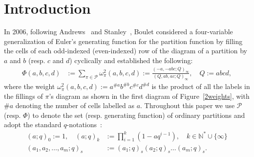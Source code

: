 \documentclass[12pt]{amsart}
\numberwithin{equation}{section}
\theoremstyle{plain}
\theoremstyle{definition}
\newcommand{\N}{\mathbb{N}}
\begin{document}
\section{Introduction}
 In 2006, following Andrews~\cite{and4} and  Stanley~\cite{st2}, Boulet \cite{bou} considered a four-variable generalization of Euler's  generating function  for the partition function by filling the cells of each odd-indexed (even-indexed) row of 
the diagram of a partition by $a$ and $b$ (resp. $c$ and $d$) cyclically 
and established the following:
\begin{align}\label{boulet}
\Phi(a,b,c,d) &:=\sum\limits_{\pi\in\mathcal{P}} \omega^2_{\pi}(a,b,c,d):=\frac{(-a,-abc;Q)_{\infty}}{(Q,ab,ac;Q)_{\infty}}, \quad Q:=abcd,
\end{align} 
where the weight $\omega^2_{\pi}(a,b,c,d):=a^{\# a}b^{\# b}c^{\# c}d^{\# d}$ is the product  of all the labels in the fillings of $\pi$'s diagram 
  as shown in the first diagram of Figure~\ref{2weights}, with 
$\# a$ denoting the number of cells labelled as $a$.  Throughout this paper we use $\mathcal{P}$ (resp. $\Phi$) to denote the set (resp. generating function) of ordinary partitions and adopt the standard $q$-notations~\cite{gara}:
\begin{align*}
(a;q)_0  :=1,\quad
(a;q)_k & := \prod_{i=1}^{k}(1-aq^{i-1}),\quad k\in \N^*\cup{\{\infty\}}\\

(a_1,a_2,\ldots,a_m;q)_s & := (a_1;q)_s(a_2;q)_s\ldots(a_m;q)_s.
\end{align*}
\end{document}
